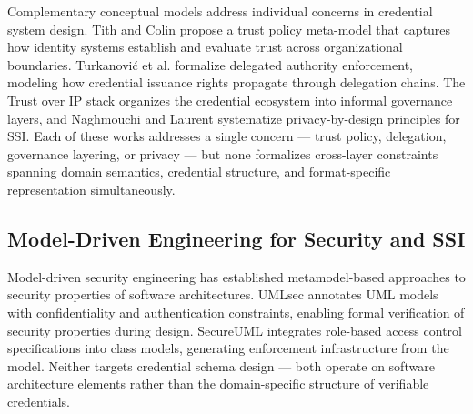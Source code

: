 Complementary conceptual models address individual concerns in credential system design. Tith and Colin \citep{tith_trust_2025} propose a trust policy meta-model that captures how identity systems establish and evaluate trust across organizational boundaries. Turkanović et al. \citep{turkanovic_model_2025} formalize delegated authority enforcement, modeling how credential issuance rights propagate through delegation chains. The Trust over IP stack \citep{davie_trust_2019} organizes the credential ecosystem into informal governance layers, and Naghmouchi and Laurent \citep{naghmouchi_systematic_2025} systematize privacy-by-design principles for SSI.  Each of these works addresses a single concern --- trust policy, delegation, governance layering, or privacy --- but none formalizes cross-layer constraints spanning domain semantics, credential structure, and format-specific representation simultaneously.

\subsection{Model-Driven Engineering for Security and SSI}\label{model-driven-engineering-for-security-and-ssi}

\label{sec:rw-mde}

Model-driven security engineering has established metamodel-based approaches to security properties of software architectures. UMLsec \citep{noauthor_secure_2005} annotates UML models with confidentiality and authentication constraints, enabling formal verification of security properties during design. SecureUML \citep{basin_model_2006} integrates role-based access control specifications into class models, generating enforcement infrastructure from the model. Neither targets credential schema design --- both operate on software architecture elements rather than the domain-specific structure of verifiable credentials.

